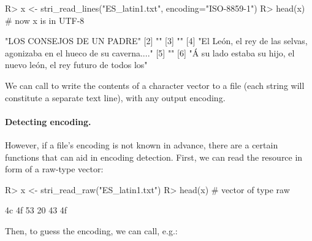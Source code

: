 \documentclass[nojss]{jss}\usepackage[]{graphicx}\usepackage[]{color}
\begin{document}
\begin{Schunk}
\begin{Sinput}
R> x <- stri_read_lines("ES_latin1.txt", encoding="ISO-8859-1")
R> head(x)  # now x is in UTF-8
\end{Sinput}
\begin{Soutput}
[1] "LOS CONSEJOS DE UN PADRE"
[2] ""
[3] ""
[4] "El León, el rey de las selvas, agonizaba en el hueco de su caverna...."
[5] ""
[6] "Á su lado estaba su hijo, el nuevo león, el rey futuro de todos los"
\end{Soutput}
\end{Schunk}


We can call  to write the contents
of a character vector to a file (each string will
constitute a separate text line), with any output encoding.




\paragraph{Detecting encoding.}
However, if a file's encoding is not known in advance, there are
a certain functions that can aid in encoding detection.
First, we can read the resource in form of a raw-type vector:

%

\begin{Schunk}
\begin{Sinput}
R> x <- stri_read_raw("ES_latin1.txt")
R> head(x)  # vector of type raw
\end{Sinput}
\begin{Soutput}
[1] 4c 4f 53 20 43 4f
\end{Soutput}
\end{Schunk}

Then, to guess the encoding, we can call, e.g.:
\end{document}
